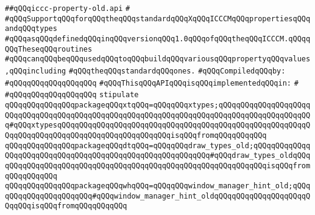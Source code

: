 \label{src/lib/x-kit/xclient/src/iccc/iccc-property-old.api}
\verb|##qQQqiccc-property-old.api|\newline
\verb|#|\newline
\verb|#qQQqSupportqQQqforqQQqtheqQQqstandardqQQqXqQQqICCCMqQQqpropertiesqQQqandqQQqtypes|\newline
\verb|#qQQqasqQQqdefinedqQQqinqQQqversionqQQq1.0qQQqofqQQqtheqQQqICCCM.qQQqqQQqTheseqQQqroutines|\newline
\verb|#qQQqcanqQQqbeqQQqusedqQQqtoqQQqbuildqQQqvariousqQQqpropertyqQQqvalues,qQQqincluding|\newline
\verb|#qQQqtheqQQqstandardqQQqones.|\newline
\newline
\verb|#qQQqCompiledqQQqby:|\newline
\verb|#qQQqqQQqqQQqqQQqqQQq|\newline
\newline
\newline
\verb|#qQQqThisqQQqAPIqQQqisqQQqimplementedqQQqin:|\newline
\verb|#|\newline
\verb|#qQQqqQQqqQQqqQQqqQQq|\newline
\newline
\verb|stipulate|\newline
\verb|qQQqqQQqqQQqqQQqpackageqQQqxtqQQq=qQQqqQQqxtypes;qQQqqQQqqQQqqQQqqQQqqQQqqQQqqQQqqQQqqQQqqQQqqQQqqQQqqQQqqQQqqQQqqQQqqQQqqQQqqQQqqQQqqQQqqQQq#qQQqxtypesqQQqqQQqqQQqqQQqqQQqqQQqqQQqqQQqqQQqqQQqqQQqqQQqqQQqqQQqqQQqqQQqqQQqqQQqqQQqqQQqqQQqqQQqqQQqqQQqisqQQqfromqQQqqQQqqQQq|\newline
\verb|qQQqqQQqqQQqqQQqpackageqQQqdtqQQq=qQQqqQQqdraw_types_old;qQQqqQQqqQQqqQQqqQQqqQQqqQQqqQQqqQQqqQQqqQQqqQQqqQQqqQQqqQQq#qQQqdraw_types_oldqQQqqQQqqQQqqQQqqQQqqQQqqQQqqQQqqQQqqQQqqQQqqQQqqQQqqQQqqQQqqQQqisqQQqfromqQQqqQQqqQQq|\newline
\verb|qQQqqQQqqQQqqQQqpackageqQQqwhqQQq=qQQqqQQqwindow_manager_hint_old;qQQqqQQqqQQqqQQqqQQqqQQq#qQQqwindow_manager_hint_oldqQQqqQQqqQQqqQQqqQQqqQQqqQQqisqQQqfromqQQqqQQqqQQq|\newline
